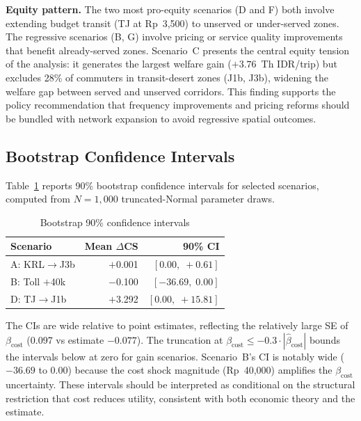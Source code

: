 \documentclass[12pt,a4paper]{article}
\begin{document}
\textbf{Equity pattern.} The two most pro-equity scenarios (D and F) both involve extending budget transit (TJ at Rp~3,500) to unserved or under-served zones. The regressive scenarios (B, G) involve pricing or service quality improvements that benefit already-served zones. Scenario~C presents the central equity tension of the analysis: it generates the largest welfare gain ($+3.76$~Th IDR/trip) but excludes 28\% of commuters in transit-desert zones (J1b, J3b), widening the welfare gap between served and unserved corridors. This finding supports the policy recommendation that frequency improvements and pricing reforms should be bundled with network expansion to avoid regressive spatial outcomes.

\subsection{Bootstrap Confidence Intervals}

Table~\ref{tab:bootstrap} reports 90\% bootstrap confidence intervals for selected scenarios, computed from $N = 1{,}000$ truncated-Normal parameter draws.

\begin{table}[ht]
\centering
\caption{Bootstrap 90\% confidence intervals}
\label{tab:bootstrap}
\begin{tabular}{lrr}
\toprule
Scenario & Mean $\Delta$CS & 90\% CI \\
\midrule
A: KRL$\to$J3b    & $+$0.001 & $[0.00,\; +0.61]$ \\
B: Toll $+$40k    & $-$0.100 & $[-36.69,\; 0.00]$ \\
D: TJ$\to$J1b     & $+$3.292 & $[0.00,\; +15.81]$ \\
\bottomrule
\end{tabular}
\end{table}

The CIs are wide relative to point estimates, reflecting the relatively large SE of $\beta_{\text{cost}}$ (0.097 vs estimate $-0.077$). The truncation at $\beta_{\text{cost}} \leq -0.3 \cdot |\hat{\beta}_{\text{cost}}|$ bounds the intervals below at zero for gain scenarios. Scenario~B's CI is notably wide ($-36.69$ to 0.00) because the cost shock magnitude (Rp~40,000) amplifies the $\beta_{\text{cost}}$ uncertainty. These intervals should be interpreted as conditional on the structural restriction that cost reduces utility, consistent with both economic theory and the \citet{ilahi2021} estimate.

\end{document}
